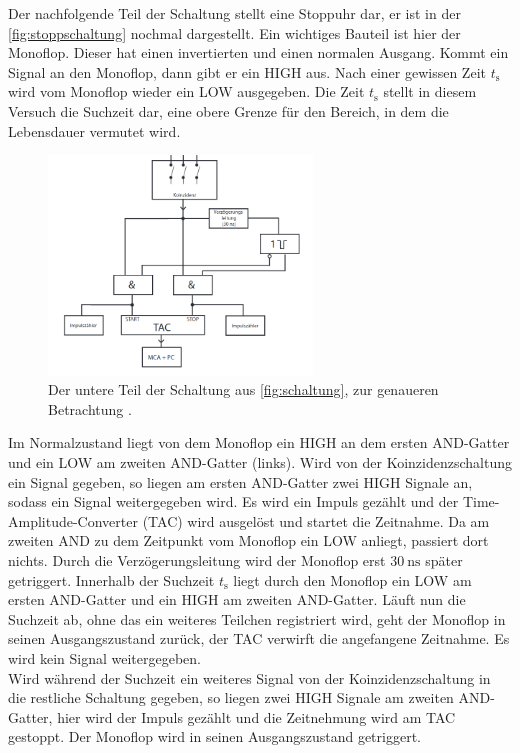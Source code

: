 \noindent Der nachfolgende Teil der Schaltung stellt eine Stoppuhr dar, er ist in der \autoref{fig:stoppschaltung} nochmal dargestellt. Ein wichtiges Bauteil ist hier der Monoflop. Dieser hat einen invertierten und einen normalen Ausgang. Kommt ein 
Signal an den Monoflop, dann gibt er ein HIGH aus. Nach einer gewissen Zeit $t_\text{s}$ wird vom Monoflop wieder ein LOW ausgegeben. Die Zeit $t_\text{s}$ stellt in diesem Versuch die 
Suchzeit dar, eine obere Grenze für den Bereich, in dem die Lebensdauer vermutet wird. \\
\begin{figure}
    \includegraphics[width=7cm]{bilder/unten_schaltung.png}
    \caption{Der untere Teil der Schaltung aus \autoref{fig:schaltung}, zur genaueren Betrachtung \cite{anleitung}.}
    \label{fig:stoppschaltung}
\end{figure}
Im Normalzustand liegt von dem Monoflop ein HIGH an dem ersten AND-Gatter und ein LOW am zweiten AND-Gatter (links). Wird von der Koinzidenzschaltung ein Signal gegeben, so liegen am 
ersten AND-Gatter zwei HIGH Signale an, sodass ein Signal weitergegeben wird. Es wird ein Impuls gezählt und der Time-Amplitude-Converter (TAC) wird ausgelöst und startet die Zeitnahme. 
Da am zweiten AND zu dem Zeitpunkt vom Monoflop ein LOW anliegt, passiert dort nichts. Durch die Verzögerungsleitung wird der Monoflop erst $\SI{30}{\nano\second}$ später getriggert. 
Innerhalb der Suchzeit $t_\text{s}$ liegt durch den Monoflop ein LOW am ersten AND-Gatter und ein HIGH am zweiten AND-Gatter.
Läuft nun die Suchzeit ab, ohne das ein weiteres Teilchen registriert wird, geht der Monoflop in seinen Ausgangszustand zurück, der TAC verwirft die angefangene Zeitnahme. Es wird kein 
Signal weitergegeben. \\
Wird während der Suchzeit ein weiteres Signal von der Koinzidenzschaltung in die restliche Schaltung gegeben, so liegen zwei HIGH Signale am zweiten AND-Gatter, hier wird der Impuls 
gezählt und die Zeitnehmung wird am TAC gestoppt. Der Monoflop wird in seinen Ausgangszustand getriggert. \\
